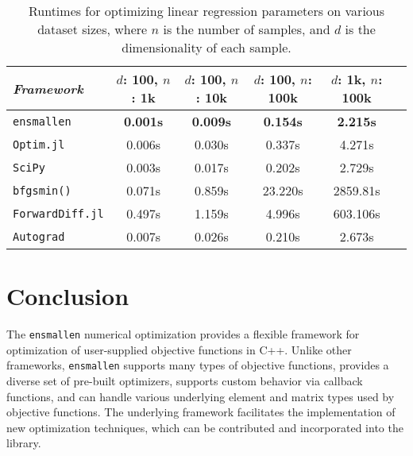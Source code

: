 \documentclass[twoside,11pt]{article}
\begin{document}
\begin{table}[t!]
{\small
\centering
\begin{tabular}{lccccc}
\toprule
{\em Framework} & $d$: 100, $n$: 1k & $d$: 100, $n$: 10k & $d$: 100, $n$:
100k & $d$: 1k, $n$: 100k \\
\midrule
\texttt{ensmallen} & {\bf 0.001s} & {\bf 0.009s} & {\bf 0.154s} & {\bf 2.215s} \\
\texttt{Optim.jl}  & 0.006s & 0.030s & 0.337s & 4.271s \\
\texttt{SciPy} & 0.003s & 0.017s & 0.202s & 2.729s \\
\texttt{bfgsmin()} & 0.071s & 0.859s & 23.220s & 2859.81s\\
\texttt{ForwardDiff.jl} & 0.497s & 1.159s & 4.996s & 603.106s \\
\texttt{Autograd} & 0.007s & 0.026s & 0.210s & 2.673s \\
\bottomrule
\end{tabular}
\vspace*{-0.4em}
\caption{
Runtimes for optimizing linear regression parameters on various dataset sizes,
where $n$ is the number of samples,
and $d$ is the dimensionality of each sample.
}
\label{tab:lbfgs}
}
\vspace*{-2.2em}
\end{table}


\section{Conclusion}

The {\tt ensmallen} numerical optimization provides a flexible framework
for optimization of user-supplied objective functions in C++.
Unlike other frameworks, {\tt ensmallen} supports many types of objective functions,
provides a diverse set of pre-built optimizers,
supports custom behavior via callback functions,
and can handle various underlying element and matrix types used by objective functions.
The underlying framework facilitates the implementation of new optimization techniques,
which can be contributed and incorporated into the library.
\end{document}

